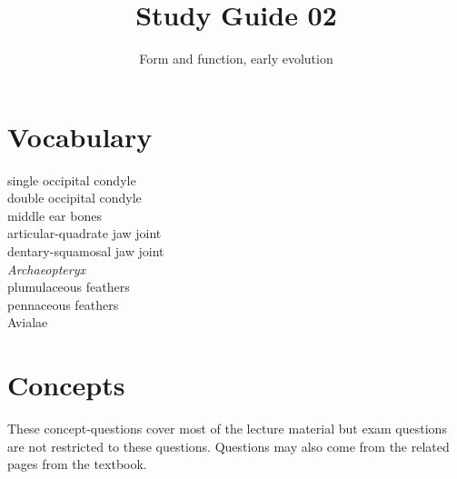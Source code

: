 \documentclass[nofonts, letterpaper]{tufte-handout}
\title{Study Guide 02}
\author{Form and function, early evolution}
\date{} %
\begin{document}
\maketitle	%


\section{Vocabulary}
\vspace{-1\baselineskip}
\begin{multicols}{2}
single occipital condyle \\
double occipital condyle \\
middle ear bones \\
articular-quadrate jaw joint \\
dentary-squamosal jaw joint \\
\textit{Archaeopteryx} \\
plumulaceous feathers \\
pennaceous feathers \\
Avialae 
\end{multicols}

\section{Concepts}

These concept-questions cover most of the lecture material but exam questions are not restricted to these questions. Questions may also come from the related pages from the textbook.\vspace{\baselineskip}
\end{document}
